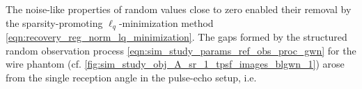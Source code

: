 The noise-like properties of
random values close to zero enabled
their removal by
the sparsity-promoting $\ell_{q}$-minimization method
\eqref{eqn:recovery_reg_norm_lq_minimization}.
The gaps formed by
the structured random observation process
\eqref{eqn:sim_study_params_ref_obs_proc_gwn} for
the wire phantom
(cf. \cref{fig:sim_study_obj_A_sr_1_tpsf_images_blgwn_1}) arose from
the single reception angle in
the pulse-echo setup, i.e.
